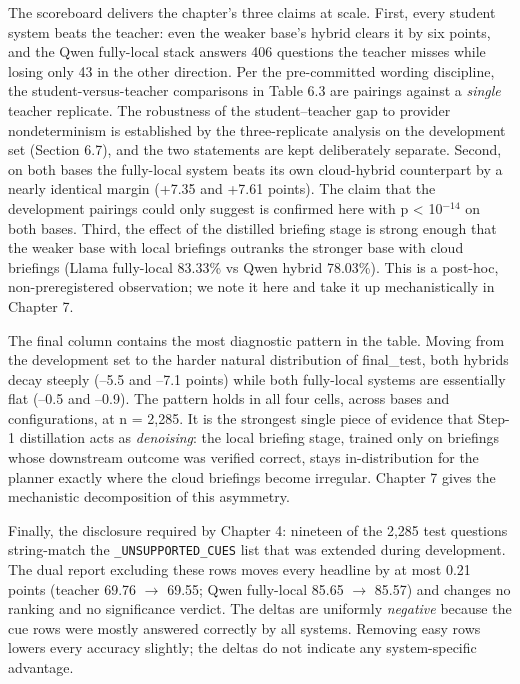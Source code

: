 \documentclass[10pt]{article} %
\begin{document}
The scoreboard delivers the chapter's three claims at scale. First, every student system beats
the teacher: even the weaker base's hybrid clears it by six points, and the Qwen fully-local
stack answers 406 questions the teacher misses while losing only 43 in the other direction.
Per the pre-committed wording discipline, the student-versus-teacher comparisons in Table 6.3
are pairings against a \emph{single} teacher replicate. The robustness of the student--teacher gap
to provider nondeterminism is established by the three-replicate analysis on the development
set (Section 6.7), and the two statements are kept deliberately separate. Second, on both
bases the fully-local system beats its own cloud-hybrid counterpart by a nearly identical
margin (+7.35 and +7.61 points). The claim that the development pairings could only suggest is
confirmed here with p < 10$^{-14}$ on both bases. Third, the effect of the distilled briefing stage
is strong enough that the weaker base with local briefings outranks the stronger base with
cloud briefings (Llama fully-local 83.33\% vs Qwen hybrid 78.03\%). This is a post-hoc,
non-preregistered observation; we note it here and take it up mechanistically in Chapter 7.

The final column contains the most diagnostic pattern in the table. Moving from the
development set to the harder natural distribution of final\_test, both hybrids decay steeply
(--5.5 and --7.1 points) while both fully-local systems are essentially flat (--0.5 and --0.9).
The pattern holds in all four cells, across bases and configurations, at n = 2,285. It is the
strongest single piece of evidence that Step-1 distillation acts as \emph{denoising}: the local
briefing stage, trained only on briefings whose downstream outcome was verified correct, stays
in-distribution for the planner exactly where the cloud briefings become irregular. Chapter 7
gives the mechanistic decomposition of this asymmetry.

Finally, the disclosure required by Chapter 4: nineteen of the 2,285 test questions
string-match the \texttt{\_UNSUPPORTED\_CUES} list that was extended during development. The dual
report excluding these rows moves every headline by at most 0.21 points (teacher 69.76 $\rightarrow$
69.55; Qwen fully-local 85.65 $\rightarrow$ 85.57) and changes no ranking and no significance verdict.
The deltas are uniformly \emph{negative} because the cue rows were mostly answered correctly by all
systems. Removing easy rows lowers every accuracy slightly; the deltas do not indicate any
system-specific advantage.
\end{document}
